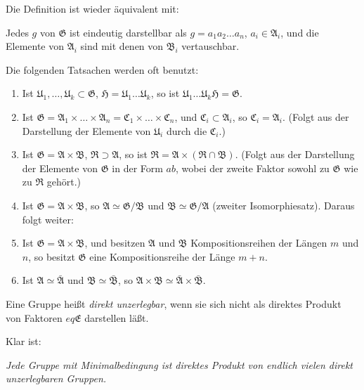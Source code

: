 \documentclass[12pt,a4paper]{article}
\newcommand{\dprod}{\times}             %
\theoremstyle{definition}
\begin{document}
Die Definition ist wieder \"aquivalent mit:

Jedes $g$ von $\mathfrak{G}$ ist eindeutig darstellbar als
$g = a_1 a_2 \dots a_n$, $a_i \in \mathfrak{A}_i$, und die Elemente von
$\mathfrak{A}_i$ sind mit denen von $\mathfrak{B}_i$ vertauschbar.

Die folgenden Tatsachen werden oft benutzt:
\begin{enumerate}[label=\arabic*.]
  \item Ist $\mathfrak{U}_1, \dots, \mathfrak{U}_k \subset \mathfrak{G}$,
    $\mathfrak{H} = \mathfrak{U}_1 \dots \mathfrak{U}_k$, so ist
    $\mathfrak{U}_1 \dots \mathfrak{U}_k \mathfrak{H} = \mathfrak{G}$.
  \item Ist $\mathfrak{G} = \mathfrak{A}_1 \dprod \dots \dprod
    \mathfrak{A}_n = \mathfrak{C}_1 \dprod \dots \dprod
    \mathfrak{C}_n$, und $\mathfrak{C}_i \subset \mathfrak{A}_i$, so
    $\mathfrak{C}_i = \mathfrak{A}_i$. (Folgt aus der Darstellung der
    Elemente von $\mathfrak{U}_i$ durch die $\mathfrak{C}_i$.)
  \item Ist $\mathfrak{G} = \mathfrak{A} \dprod \mathfrak{B}$,
    $\mathfrak{R} \supset \mathfrak{A}$, so ist $\mathfrak{R} =
    \mathfrak{A} \dprod (\mathfrak{R} \cap \mathfrak{B})$. (Folgt aus
    der Darstellung der Elemente von $\mathfrak{G}$ in der Form $ab$,
    wobei der zweite Faktor sowohl zu $\mathfrak{G}$ wie zu
    $\mathfrak{R}$ geh\"ort.)
  \item Ist $\mathfrak{G} = \mathfrak{A} \dprod \mathfrak{B}$, so
    $\mathfrak{A} \simeq \mathfrak{G}/\mathfrak{B}$ und
    $\mathfrak{B} \simeq \mathfrak{G}/\mathfrak{A}$ (zweiter
    Isomorphiesatz). Daraus folgt weiter:
  \item Ist $\mathfrak{G} = \mathfrak{A} \dprod \mathfrak{B}$, und
    besitzen $\mathfrak{A}$ und $\mathfrak{B}$ Kompositionsreihen der
    L\"angen $m$ und $n$, so besitzt $\mathfrak{G}$ eine
    Kompositionsreihe der L\"ange $m+n$.
  \item Ist $\mathfrak{A} \simeq \bar{\mathfrak{A}}$ und
    $\mathfrak{B} \simeq \bar{\mathfrak{B}}$, so
    $\mathfrak{A} \dprod \mathfrak{B} \simeq \bar{\mathfrak{A}}
    \dprod \bar{\mathfrak{B}}$.
\end{enumerate}

Eine Gruppe hei\ss t \textit{direkt unzerlegbar}, wenn sie sich nicht als
direktes Produkt von Faktoren $ eq \mathfrak{E}$ darstellen l\"a\ss t.

Klar ist:

\textit{Jede Gruppe mit Minimalbedingung ist direktes Produkt von
endlich vielen direkt unzerlegbaren Gruppen.}
\end{document}
